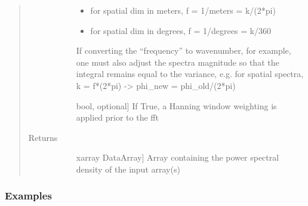 \documentclass[letterpaper,10pt,english]{sphinxmanual}
\begin{document}
\begin{fulllineitems}
\begin{quote}
\begin{description}
\begin{description}
\begin{itemize}
\item {} 
for spatial dim in meters, f = 1/meters = k/(2*pi)

\item {} 
for spatial dim in degrees, f = 1/degrees = k/360

\end{itemize}

If converting the “frequency” to wavenumber, for example, one must also adjust the spectra                     magnitude so that the integral remains equal to the variance, e.g. for spatial spectra,                    k = f*(2*pi)  -\textgreater{}  phi\_new = phi\_old/(2*pi)

\item[{\sphinxstylestrong{hanning}}] \leavevmode{[}bool, optional{]}
If True, a Hanning window weighting is applied prior to the fft

\end{description}

\item[{Returns}] \leavevmode\begin{description}
\item[{}] \leavevmode{[}xarray DataArray{]}
Array containing the power spectral density of the input array(s)

\end{description}

\end{description}\end{quote}
\subsubsection*{Examples}


\end{fulllineitems}
\end{document}
